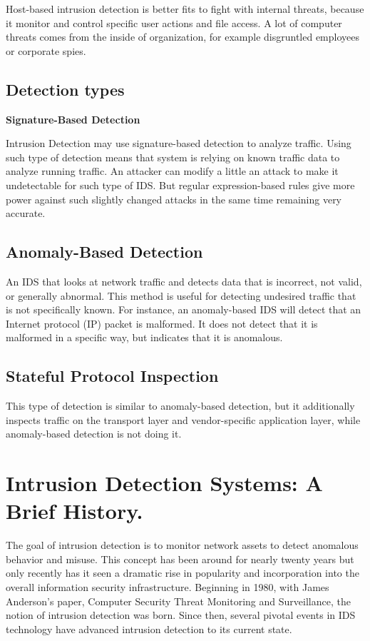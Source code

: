 \documentclass[thesis=M,english]{FITthesis}[2011/07/15]
\begin{document}
Host-based intrusion detection is better fits to fight with internal threats, because it monitor and control specific user actions and file access. A lot of computer threats comes from the inside of organization, for example disgruntled employees or corporate spies.

\subsection*{Detection types}

\textbf{Signature-Based Detection}

Intrusion Detection may use signature-based detection to analyze traffic. Using such type of detection means that system is relying on known traffic data to analyze running traffic. An attacker can modify a little an attack to make it undetectable for such type of IDS. But regular expression-based rules give more power against such slightly changed attacks in the same time remaining very accurate.

\subsection*{Anomaly-Based Detection}
An IDS that looks at network traffic and detects data that is incorrect, not valid, or generally abnormal. This method is useful for detecting undesired traffic that is not specifically known. For instance, an anomaly-based IDS will detect that an Internet protocol (IP) packet is malformed. It does not detect that it is malformed in a specific way, but indicates that it is anomalous.

\subsection*{Stateful Protocol Inspection}
This type of detection is similar to anomaly-based detection, but it additionally inspects traffic on the transport layer and vendor-specific application layer, while anomaly-based detection is not doing it.

\section{Intrusion Detection Systems: A Brief History.}
The goal of intrusion detection is to monitor network assets to detect anomalous behavior and misuse. This concept has been around for nearly twenty years but only recently has it seen a dramatic rise in popularity and incorporation into the overall information security infrastructure. Beginning in 1980, with James Anderson's paper, Computer Security Threat Monitoring and Surveillance, the notion of intrusion detection was born. Since then, several pivotal events in IDS technology have advanced intrusion detection to its current state.
\end{document}
